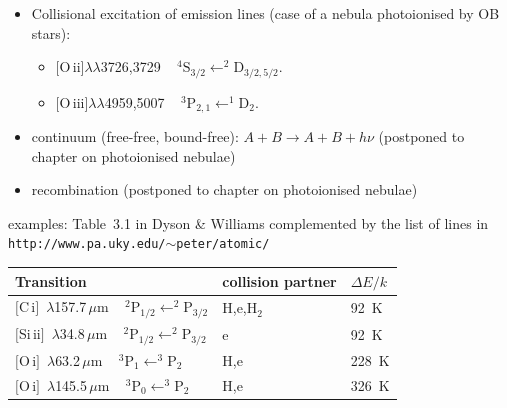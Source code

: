 \begin{itemize}
\item Collisional excitation of emission lines  (case of a nebula
photoionised by OB stars):
\begin{itemize}
\item   $[$O\,{\sc ii}$]\lambda\lambda$3726,3729 ~ $\mathrm{^4S_{3/2} \leftarrow ^2\!D_{3/2,5/2} } $.
\item   $[$O\,{\sc iii}$]\lambda\lambda$4959,5007 ~ $\mathrm{^3P_{2,1} \leftarrow ^1D_{2} } $.
\end{itemize}
\item continuum (free-free, bound-free):  $A + B   \rightarrow   A +
  B + h\nu $ (postponed to chapter on
  photoionised nebulae)
\item recombination (postponed to chapter on photoionised nebulae)
\end{itemize}


\foilhead{\textcolor{red}{Cooling of the neutral ISM}}


examples: Table~3.1 in Dyson \& Williams complemented by the list of
lines in {\tt http://www.pa.uky.edu/$\sim$peter/atomic/}

\begin{center}
\begin{tabular} {lll}
Transition   &    collision partner &  $\Delta E / k$ \\   \hline 
$[$C\,{\sc i}$]$~$\lambda$157.7\,$\mu$m ~ $\mathrm{^2P_{1/2} \leftarrow ^2P_{3/2} } $    & H,e,H$_2$  &   92~K \\
$[$Si\,{\sc ii}$]$~$\lambda$34.8\,$\mu$m ~ $\mathrm{^2P_{1/2} \leftarrow ^2P_{3/2} } $    & e  &   92~K \\
$[$O\,{\sc i}$]$~$\lambda$63.2\,$\mu$m ~ $\mathrm{^3P_{1} \leftarrow ^3P_{2} } $    & H,e  &   228~K \\
$[$O\,{\sc i}$]$~$\lambda$145.5\,$\mu$m ~ $\mathrm{^3P_{0} \leftarrow ^3P_{2} } $    & H,e  &   326~K \\
\end{tabular}
\end{center}



